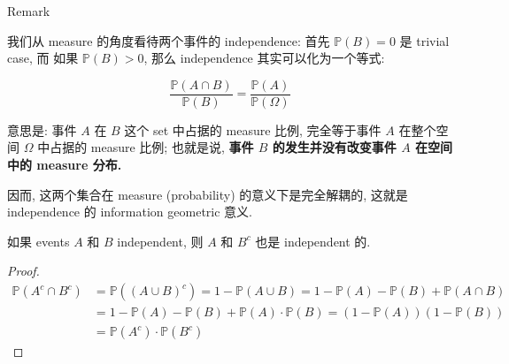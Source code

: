 \documentclass{qlnotes-export}
\begin{document}
\begin{qlremark}{Remark}

我们从 measure 的角度看待两个事件的 independence: 首先 \({\mathbb{P}}(B) = 0\) 是 trivial case, 而 如果 \({\mathbb{P}}(B) > 0\), 那么 independence 其实可以化为一个等式:

\[\frac{{\mathbb{P}}(A \cap B)}{{\mathbb{P}}(B)} = \frac{{\mathbb{P}}(A)}{{\mathbb{P}}(\Omega)}\]

意思是: 事件 \(A\) 在 \(B\) 这个 set 中占据的 measure 比例, 完全等于事件 \(A\) 在整个空间 \(\Omega\) 中占据的 measure 比例; 也就是说, \textbf{事件 \(B\) 的发生并没有改变事件 \(A\) 在空间中的 measure 分布.}

因而, 这两个集合在 measure (probability) 的意义下是完全解耦的, 这就是 independence 的 information geometric 意义.

\end{qlremark}

\begin{proposition}

如果 events \(A\) 和 \(B\) independent, 则 \(A\) 和 \(B^{c}\) 也是 independent 的.

\end{proposition}

\begin{proof}

\[\begin{matrix}
{{\mathbb{P}}\left( {A^{c} \cap B^{c}} \right)} & {= {\mathbb{P}}\left( {(A \cup B)^{c}} \right) = 1 - {\mathbb{P}}(A \cup B) = 1 - {\mathbb{P}}(A) - {\mathbb{P}}(B) + {\mathbb{P}}(A \cap B)} \\
 & {= 1 - {\mathbb{P}}(A) - {\mathbb{P}}(B) + {\mathbb{P}}(A) \cdot {\mathbb{P}}(B) = (1 - {\mathbb{P}}(A))(1 - {\mathbb{P}}(B))} \\
 & {= {\mathbb{P}}\left( A^{c} \right) \cdot {\mathbb{P}}\left( B^{c} \right)}
\end{matrix}\]

\end{proof}
\end{document}
